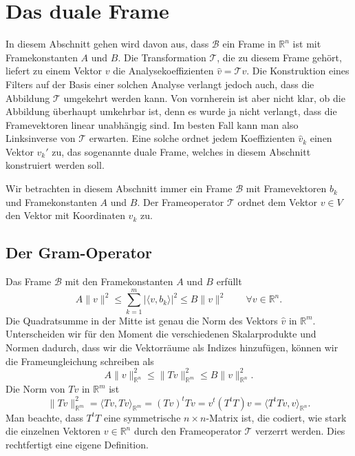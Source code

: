 %
%
%
\section{Das duale Frame\label{section:dual}}
In diesem Abschnitt gehen wird davon aus, dass $\mathcal{B}$ ein
Frame in $\mathbb{R}^n$ ist mit Framekonstanten $A$ und $B$.
Die Transformation $\mathcal{T}$, die zu diesem Frame gehört, liefert 
zu einem Vektor $v$ die Analysekoeffizienten $\hat{v} = \mathcal{T}v$.
Die Konstruktion eines Filters auf der Basis einer solchen Analyse verlangt
jedoch auch, dass die Abbildung $\mathcal{T}$ umgekehrt werden kann.
Von vornherein ist aber nicht klar, ob die Abbildung überhaupt umkehrbar ist,
denn es wurde ja nicht verlangt, dass die Framevektoren linear unabhängig
sind.
Im besten Fall kann man also Linksinverse von $\mathcal{T}$ erwarten.
Eine solche ordnet jedem Koeffizienten $\hat{v}_k$ einen Vektor $v_k'$
zu, das sogenannte duale Frame, welches in diesem Abschnitt konstruiert
werden soll.

Wir betrachten in diesem Abschnitt immer ein Frame $\mathcal{B}$
mit Framevektoren $b_k$ und Framekonstanten $A$ und $B$.
Der Frameoperator $\mathcal{T}$ ordnet dem Vektor $v\in V$ den Vektor
mit Koordinaten $\hat{v}_k$ zu.

\subsection{Der Gram-Operator}
Das Frame $\mathcal{B}$ mit den Framekonstanten $A$ und $B$ erfüllt
\[
A\|v\|^2 \le \sum_{k=1}^m |\langle v,b_k\rangle|^2 \le B\|v\|^2
\qquad\forall v\in \mathbb R^n.
\]
Die Quadratsumme in der Mitte ist genau die Norm des Vektors
$\hat{v}$ in $\mathbb R^m$.
Unterscheiden wir für den Moment die verschiedenen Skalarprodukte
und Normen dadurch, dass wir die Vektorräume als Indizes hinzufügen,
können wir die Frameungleichung schreiben als
\[
A \| v\|_{\mathbb R^n}^2
\le
\| Tv\|_{\mathbb R^m}^2
\le
B \| v\|_{\mathbb R^n}^2.
\]
Die Norm von $Tv$ in $\mathbb R^m$ ist
\[
\| Tv\|_{\mathbb R^m}^2
=
\langle Tv,Tv\rangle_{\mathbb R^m}
=
(Tv)^tTv
=
v^t(T^tT)v
=
\langle T^tTv,v\rangle_{\mathbb R^n}.
\]
Man beachte, dass $T^tT$ eine symmetrische $n\times n$-Matrix ist,
die codiert, wie stark die einzelnen Vektoren $v\in\mathbb R^n$ durch
den Frameoperator $\mathcal{T}$ verzerrt werden.
Dies rechtfertigt eine eigene Definition.

